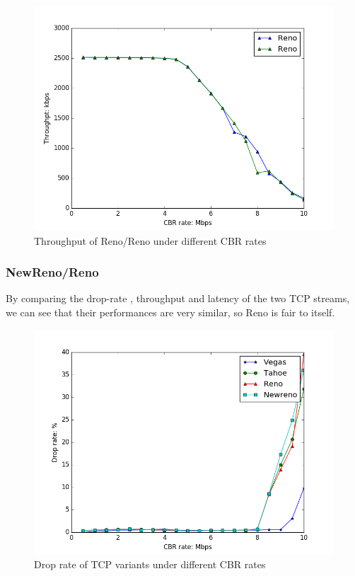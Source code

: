 \documentclass[10pt, conference]{IEEEtran/IEEEtran}
\begin{document}
\begin{figure}[htbp]
\begin{center}
\includegraphics[width=\linewidth]{../exp2/exp2_Reno_Reno_thpt.png}
\caption{Throughput of Reno/Reno under different CBR rates}
\label{exp2_Reno_Reno_thpt}
\end{center}
\end{figure}

\subsubsection{NewReno/Reno}
By comparing the drop-rate , throughput and latency of the two TCP streams,  we can see that their performances are very similar, so Reno is fair to itself. 

\begin{figure}[htbp]
\begin{center}
\includegraphics[width=\linewidth]{../exp1/exp1_drop.png}
\caption{Drop rate of TCP variants under different CBR rates}
\label{exp1_drop}
\end{center}
\end{figure}
\end{document}
